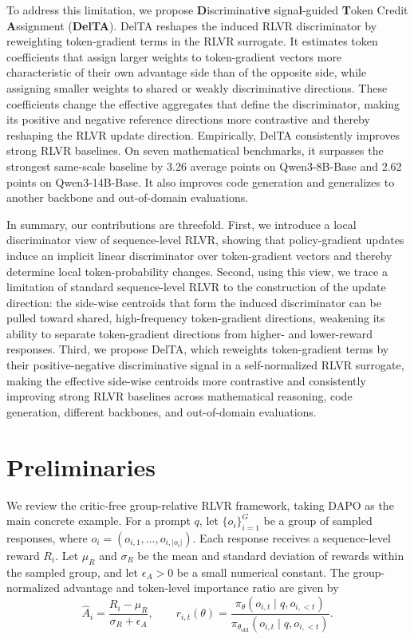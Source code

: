 \documentclass{llmxive}
\begin{document}
To address this limitation, we propose \textbf{D}iscriminativ\textbf{e} signa\textbf{l}-guided \textbf{T}oken Credit \textbf{A}ssignment (\textbf{DelTA}). 
DelTA reshapes the induced RLVR discriminator by reweighting token-gradient terms in the RLVR surrogate. 
It estimates token coefficients that assign larger weights to token-gradient vectors more characteristic of their own advantage side than of the opposite side, while assigning smaller weights to shared or weakly discriminative directions. 
These coefficients change the effective aggregates that define the discriminator, making its positive and negative reference directions more contrastive and thereby reshaping the RLVR update direction. 
Empirically, DelTA consistently improves strong RLVR baselines. 
On seven mathematical benchmarks, it surpasses the strongest same-scale baseline by 3.26 average points on Qwen3-8B-Base and 2.62 points on Qwen3-14B-Base. 
It also improves code generation and generalizes to another backbone and out-of-domain evaluations.


In summary, our contributions are threefold. First, we introduce a local discriminator view of sequence-level RLVR, showing that policy-gradient updates induce an implicit linear discriminator over token-gradient vectors and thereby determine local token-probability changes. Second, using this view, we trace a limitation of standard sequence-level RLVR to the construction of the update direction: the side-wise centroids that form the induced discriminator can be pulled toward shared, high-frequency token-gradient directions, weakening its ability to separate token-gradient directions from higher- and lower-reward responses. Third, we propose DelTA, which reweights token-gradient terms by their positive-negative discriminative signal in a self-normalized RLVR surrogate, making the effective side-wise centroids more contrastive and consistently improving strong RLVR baselines across mathematical reasoning, code generation, different backbones, and out-of-domain evaluations.

\section{Preliminaries}
\label{sec:prelim}


We review the critic-free group-relative RLVR framework, taking DAPO as the main concrete example. For a prompt \(q\), let \(\{o_i\}_{i=1}^G\) be a group of sampled responses,
where \(o_i=(o_{i,1},\dots,o_{i,|o_i|})\). 
Each response receives a sequence-level reward \(R_i\). 
Let \(\mu_R\) and \(\sigma_R\) be the mean and standard deviation of rewards within the sampled group, and let \(\epsilon_A>0\) be a small numerical constant. 
The group-normalized advantage and token-level importance ratio are given by
\[
\hat A_i
=
\frac{R_i-\mu_R}{\sigma_R+\epsilon_A},
\qquad
r_{i,t}(\theta)
=
\frac{
\pi_\theta(o_{i,t}\mid q,o_{i,<t})
}{
\pi_{\theta_{\mathrm{old}}}(o_{i,t}\mid q,o_{i,<t})
}.
\]
\end{document}
